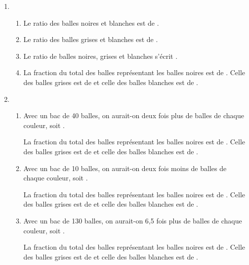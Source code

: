 \pagebreak



   \begin{enumerate}
      \item 
         \begin{enumerate}
            \item Le ratio des balles noires et blanches est de .
            \item Le ratio des balles grises et blanches est de .
            \item Le ratio de balles noires, grises et blanches s'écrit .
            \item La fraction du total des balles représentant les balles noires est de . Celle des balles grises est de  et celle des balles blanches est de .
         \end{enumerate}
      \item 
         \begin{enumerate}
            \item Avec un bac de 40 balles, on aurait-on deux fois plus de balles de chaque couleur, soit . \par
               La fraction du total des balles représentant les balles noires est de . Celle des balles grises est de  et celle des balles blanches est de .
            \item Avec un bac de 10 balles, on aurait-on deux fois moins de balles de chaque couleur, soit . \par
               La fraction du total des balles représentant les balles noires est de . Celle des balles grises est de  et celle des balles blanches est de .
            \item Avec un bac de 130 balles, on aurait-on 6,5 fois plus de balles de chaque couleur, soit . \par
               La fraction du total des balles représentant les balles noires est de . Celle des balles grises est de  et celle des balles blanches est de .

\end{enumerate}
\end{enumerate}
